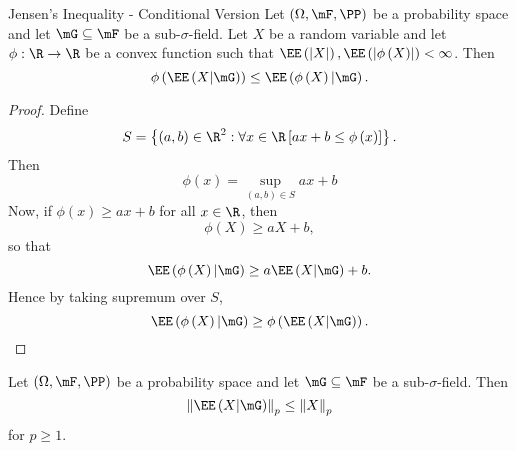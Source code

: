 \documentclass[stat901]{subfiles}
\begin{document}
    \begin{theorem}{Jensen's Inequality - Conditional Version}
        Let $\left( \Omega,\mF,\PP \right)$ be a probability space and let $\mG\subseteq\mF$ be a sub-$\sigma$-field. Let $X$ be a random variable and let $\phi:\R\to\R$ be a convex function such that $\EE\left( \left| X \right| \right),\EE\left( \left| \phi\left( X \right) \right| \right)<\infty$. Then
        \begin{equation*}
            \phi\left( \EE\left( X|\mG \right) \right) \leq \EE\left( \phi\left( X \right)|\mG \right).
        \end{equation*}
    \end{theorem}

    \begin{proof}
        Define
        \begin{equation*}
            S = \left\lbrace \left( a,b \right)\in\R^{2}: \forall x\in\R \left[ ax+b\leq\phi\left( x \right) \right] \right\rbrace.
        \end{equation*}
        Then
        \begin{equation*}
            \phi\left( x \right) = \sup_{\left( a,b \right)\in S} ax+b
        \end{equation*}
        Now, if $\phi\left( x \right)\geq ax+b$ for all $x\in\R$, then
        \begin{equation*}
            \phi\left( X \right)\geq aX+b,
        \end{equation*}
        so that
        \begin{equation*}
            \EE\left( \phi\left( X \right)|\mG \right) \geq a\EE\left( X|\mG \right) + b.
        \end{equation*}
        Hence by taking supremum over $S$,
        \begin{equation*}
            \EE\left( \phi\left( X \right)|\mG \right) \geq \phi\left( \EE\left( X|\mG \right) \right).
        \end{equation*}
    \end{proof}
    
    \begin{cor}{}
        Let $\left( \Omega,\mF,\PP \right)$ be a probability space and let $\mG\subseteq\mF$ be a sub-$\sigma$-field. Then
        \begin{equation*}
            \left\lVert \EE\left( X|\mG \right)\right\rVert_p \leq \left\lVert X\right\rVert_p
        \end{equation*}
        for $p\geq 1$.
    \end{cor}	
    
\end{document}
